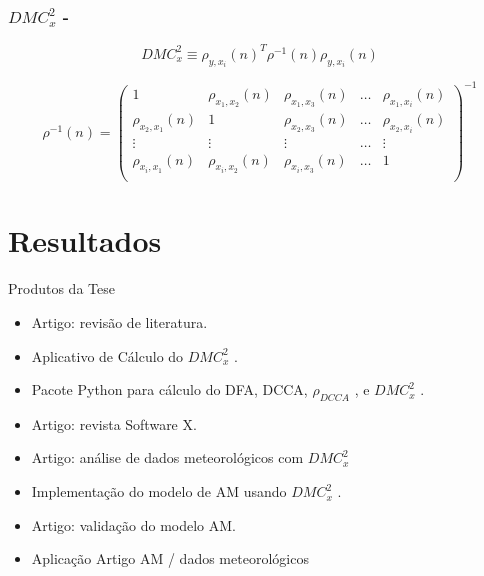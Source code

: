 \documentclass[11pt, aspectratio=169]{beamer}
\newcommand{\dmc}{\(DMC_x^2\) }
\newcommand{\pdcca}{\({\rho}_{DCCA}\) }
\begin{document}
\begin{frame}
  \frametitle{\dmc - \cite{Zebende2018}}
  \begin{equation}\label{eq:dmc}
    {DMC}_{x}^{2}  \equiv \rho_{y,x_{i}}(n)^{T} \rho^{-1}(n) \rho_{y,x_{i}}(n)
  \end{equation}


  \begin{equation}\label{eq:dmc_mat_inv}
    \rho^{-1}(n) = \left(\begin{matrix}
      1                     & \rho_{x_{1},x_{2}}(n) & \rho_{x_{1},x_{3}}(n) & \dots & \rho_{x_{1},x_{i}}(n) \\
      \rho_{x_{2},x_{1}}(n) & 1                     & \rho_{x_{2},x_{3}}(n) & \dots & \rho_{x_{2},x_{i}}(n) \\
      \vdots                & \vdots                & \vdots                & \dots & \vdots                \\
      \rho_{x_{i},x_{1}}(n) & \rho_{x_{i},x_{2}}(n) & \rho_{x_{i},x_{3}}(n) & \dots & 1                     \\
    \end{matrix}\right)^{-1}
  \end{equation}



\end{frame}



\section{Resultados}

\begin{frame}{Produtos da Tese}
  \begin{itemize}
    \item {Artigo: revisão de literatura.}
    \item Aplicativo de Cálculo do \dmc.
    \item Pacote Python para cálculo do DFA, DCCA, \pdcca, e  \dmc.
    \item Artigo: revista Software X.
    \item Artigo: análise de dados meteorológicos com \dmc

    \item Implementação do modelo de AM usando \dmc.
    \item Artigo: validação do modelo AM.
    \item Aplicação Artigo AM / dados meteorológicos
  \end{itemize}


\end{frame}
\end{document}
